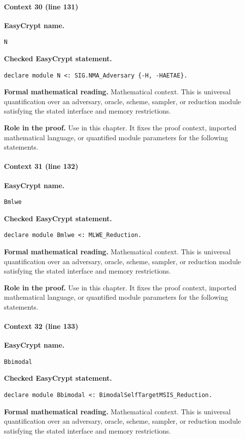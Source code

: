 \paragraph{Context 30 (line 131)}
\noindent\textbf{EasyCrypt name.}
\begin{lstlisting}[language=EasyCrypt,basicstyle=\ttfamily\scriptsize]
N
\end{lstlisting}
\noindent\textbf{Checked EasyCrypt statement.}
\begin{lstlisting}[language=EasyCrypt,basicstyle=\ttfamily\scriptsize]
declare module N <: SIG.NMA_Adversary {-H, -HAETAE}.
\end{lstlisting}
\noindent\textbf{Formal mathematical reading.}
Mathematical context. This is universal quantification over an adversary, oracle, scheme, sampler, or reduction module satisfying the stated interface and memory restrictions.

\noindent\textbf{Role in the proof.}
Use in this chapter. It fixes the proof context, imported mathematical language, or quantified module parameters for the following statements.

\paragraph{Context 31 (line 132)}
\noindent\textbf{EasyCrypt name.}
\begin{lstlisting}[language=EasyCrypt,basicstyle=\ttfamily\scriptsize]
Bmlwe
\end{lstlisting}
\noindent\textbf{Checked EasyCrypt statement.}
\begin{lstlisting}[language=EasyCrypt,basicstyle=\ttfamily\scriptsize]
declare module Bmlwe <: MLWE_Reduction.
\end{lstlisting}
\noindent\textbf{Formal mathematical reading.}
Mathematical context. This is universal quantification over an adversary, oracle, scheme, sampler, or reduction module satisfying the stated interface and memory restrictions.

\noindent\textbf{Role in the proof.}
Use in this chapter. It fixes the proof context, imported mathematical language, or quantified module parameters for the following statements.

\paragraph{Context 32 (line 133)}
\noindent\textbf{EasyCrypt name.}
\begin{lstlisting}[language=EasyCrypt,basicstyle=\ttfamily\scriptsize]
Bbimodal
\end{lstlisting}
\noindent\textbf{Checked EasyCrypt statement.}
\begin{lstlisting}[language=EasyCrypt,basicstyle=\ttfamily\scriptsize]
declare module Bbimodal <: BimodalSelfTargetMSIS_Reduction.
\end{lstlisting}
\noindent\textbf{Formal mathematical reading.}
Mathematical context. This is universal quantification over an adversary, oracle, scheme, sampler, or reduction module satisfying the stated interface and memory restrictions.

